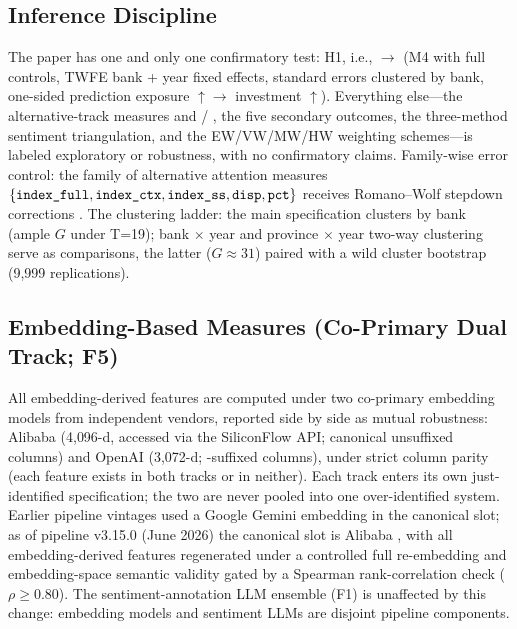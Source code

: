 \subsection{Inference Discipline}\label{subsec:inference}
The paper has one and only one confirmatory test: H1, i.e.,
 $\to$  (M4 with
full controls, TWFE bank + year fixed effects, standard errors clustered by
bank, one-sided prediction exposure $\uparrow \to$ investment $\uparrow$).
Everything else---the alternative-track measures and
 / , the five secondary
outcomes, the three-method sentiment triangulation, and the EW/VW/MW/HW
weighting schemes---is labeled exploratory or robustness, with no confirmatory
claims. Family-wise error control: the family of alternative attention
measures $\{\texttt{index\_full}, \texttt{index\_ctx}, \texttt{index\_ss},
\texttt{disp}, \texttt{pct}\}$ receives Romano--Wolf stepdown corrections
\parencite{romanowolf2005snooping}. The clustering ladder: the main
specification clusters by bank (ample $G$ under T=19); bank $\times$ year and
province $\times$ year two-way clustering serve as comparisons, the latter
($G \approx 31$) paired with a wild cluster bootstrap (9{,}999 replications).

\subsection{Embedding-Based Measures (Co-Primary Dual Track; F5)}
All embedding-derived features are computed under two co-primary
embedding models from independent vendors, reported side by side as
mutual robustness: Alibaba  (4{,}096-d,
accessed via the SiliconFlow API; canonical unsuffixed columns) and
OpenAI  (3{,}072-d; -suffixed
columns), under strict column parity (each feature exists in both
tracks or in neither). Each track enters its own just-identified
specification; the two are never pooled into one over-identified
system. Earlier pipeline vintages used a Google Gemini embedding in
the canonical slot; as of pipeline v3.15.0 (June 2026) the canonical
slot is Alibaba , with all embedding-derived
features regenerated under a controlled full re-embedding and
embedding-space semantic validity gated by a Spearman
rank-correlation check ($\rho \geq 0.80$). The sentiment-annotation
LLM ensemble (F1) is unaffected by this change: embedding models and
sentiment LLMs are disjoint pipeline components.

